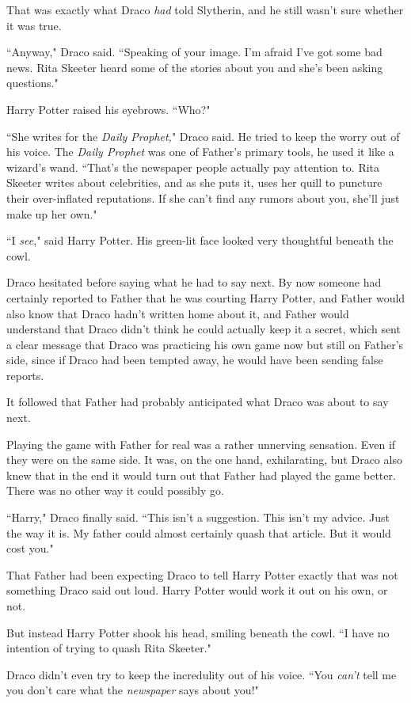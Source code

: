 That was exactly what Draco \emph{had} told Slytherin, and he still wasn't sure whether it was true.

``Anyway," Draco said. ``Speaking of your image. I'm afraid I've got some bad news. Rita Skeeter heard some of the stories about you and she's been asking questions."

Harry Potter raised his eyebrows. ``Who?"

``She writes for the \emph{Daily Prophet,}" Draco said. He tried to keep the worry out of his voice. The \emph{Daily Prophet} was one of Father's primary tools, he used it like a wizard's wand. ``That's the newspaper people actually pay attention to. Rita Skeeter writes about celebrities, and as she puts it, uses her quill to puncture their over-inflated reputations. If she can't find any rumors about you, she'll just make up her own."

``I \emph{see}," said Harry Potter. His green-lit face looked very thoughtful beneath the cowl.

Draco hesitated before saying what he had to say next. By now someone had certainly reported to Father that he was courting Harry Potter, and Father would also know that Draco hadn't written home about it, and Father would understand that Draco didn't think he could actually keep it a secret, which sent a clear message that Draco was practicing his own game now but still on Father's side, since if Draco had been tempted away, he would have been sending false reports.

It followed that Father had probably anticipated what Draco was about to say next.

Playing the game with Father for real was a rather unnerving sensation. Even if they were on the same side. It was, on the one hand, exhilarating, but Draco also knew that in the end it would turn out that Father had played the game better. There was no other way it could possibly go.

``Harry," Draco finally said. ``This isn't a suggestion. This isn't my advice. Just the way it is. My father could almost certainly quash that article. But it would cost you."

That Father had been expecting Draco to tell Harry Potter exactly that was not something Draco said out loud. Harry Potter would work it out on his own, or not.

But instead Harry Potter shook his head, smiling beneath the cowl. ``I have no intention of trying to quash Rita Skeeter."

Draco didn't even try to keep the incredulity out of his voice. ``You \emph{can't} tell me you don't care what the \emph{newspaper} says about you!"

